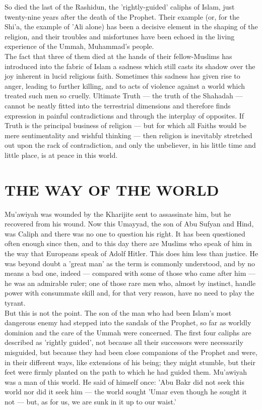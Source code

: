 \documentclass[10pt, twoside,openright]{book}
\begin{document}
So died the last of the Rashidun, the 'rightly\hyp{}guided' caliphs of Islam, just twenty-nine years after the death of the Prophet. Their example (or, for the Shi'a, the example of 'Ali alone) has been a decisive element in the shaping of the religion, and their troubles and misfortunes have been echoed in the living experience of the Ummah, Muhammad's people. \\

The fact that three of them died at the hands of their fellow\hyp{}Muslims has introduced into the fabric of Islam a sadness which still casts its shadow over the joy inherent in lucid religious faith. Sometimes this sadness has given rise to anger, leading to further killing, and to acts of violence against a world which treated such men so cruelly. Ultimate Truth --- the truth of the Shahadah --- cannot be neatly fitted into the terrestrial dimensions and therefore finds expression in painful contradictions and through the interplay of opposites. If Truth is the principal business of religion --- but for which all Faiths would be mere sentimentality and wishful thinking --- then religion is inevitably stretched out upon the rack of contradiction, and only the unbeliever, in his little time and little place, is at peace in this world. \\


\chapter{THE WAY OF THE WORLD}

Mu'awiyah was wounded by the Kharijite sent to assassinate him, but he recovered from his wound. Now 
this Umayyad, the son of Abu Sufyan and Hind, was Caliph and there was no one to question his right. 
It has been questioned often enough since then, and to this day there are Muslims who speak of him in 
the way that Europeans speak of Adolf Hitler. This does him less than justice. He was beyond doubt a 
'great man' as the term is commonly understood, and by no means a bad one, indeed --- compared with 
some of those who came after him --- he was an admirable ruler; one of those rare men who, almost by 
instinct, handle power with consummate skill and, for that very reason, have no need to play the 
tyrant. \\

But this is not the point. The son of the man who had been Islam's most dangerous enemy had stepped 
into the sandals of the Prophet, so far as worldly dominion and the care of the Ummah were concerned. 
The first four caliphs are described as 'rightly guided', not because all their successors were 
necessarily misguided, but because they had been close companions of the Prophet and were, in their 
different ways, like extensions of his being; they might stumble, but their feet were firmly planted 
on the path to which he had guided them. Mu'awiyah was a man of this world. He said of himself once: 
'Abu Bakr did not seek this world nor did it seek him --- the world sought 'Umar even though he sought 
it not --- but, as for us, we are sunk in it up to our waist.' \\
\end{document}
